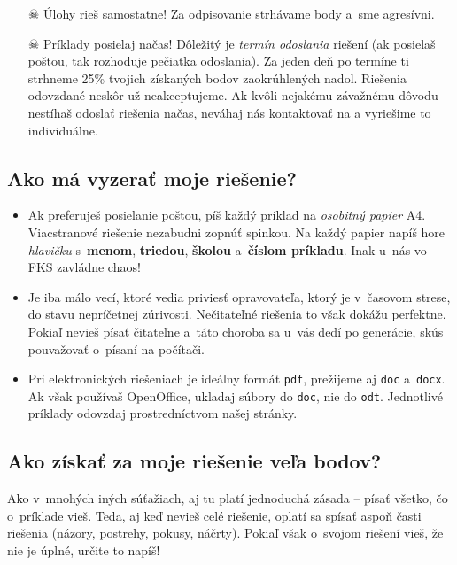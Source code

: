 \begin{itemize}
        \item[$\skull$] Úlohy rieš samostatne! Za odpisovanie strhávame body a~sme agresívni. 
    
        \item[$\skull$] Príklady posielaj načas! Dôležitý je \emph{termín odoslania} riešení (ak posielaš poštou, tak rozhoduje pečiatka odoslania).
            Za jeden deň po termíne ti strhneme 25\% tvojich získaných bodov zaokrúhlených nadol. 
            Riešenia odovzdané neskôr už neakceptujeme. Ak kvôli nejakému závažnému dôvodu nestíhaš odoslať riešenia načas, neváhaj nás kontaktovať na \URL{\seminarEmail}
            a vyriešime to individuálne.
    \end{itemize}

\subsection{Ako má vyzerať moje riešenie?}
    \begin{itemize}
        \item Ak preferuješ posielanie poštou, píš každý príklad na \emph{osobitný papier} A4. Viacstranové riešenie nezabudni
            zopnúť spinkou. Na každý papier napíš hore \emph{hlavičku} s~\textbf{menom}, \textbf{triedou}, \textbf{školou} a~\textbf{číslom príkladu}.
            Inak u~nás vo FKS zavládne chaos!
        \item Je iba málo vecí, ktoré vedia priviesť opravovateľa, ktorý je v~časovom strese, do stavu nepríčetnej zúrivosti. Nečitateľné riešenia to však dokážu perfektne.
            Pokiaľ nevieš písať čitateľne a~táto choroba sa u~vás dedí po generácie, skús pouvažovať o~písaní na počítači.
        \item Pri elektronických riešeniach je ideálny formát \texttt{pdf}, prežijeme aj \texttt{doc} a~\texttt{docx}.
            Ak však používaš OpenOffice, ukladaj súbory do \texttt{doc}, nie do \texttt{odt}.
            Jednotlivé príklady odovzdaj prostredníctvom našej stránky.
    \end{itemize}

\subsection{Ako získať za moje riešenie veľa bodov?}
    Ako v~mnohých iných súťažiach, aj tu platí jednoduchá zásada -- písať všetko, čo
    o~príklade vieš. Teda, aj keď nevieš celé riešenie, oplatí sa spísať aspoň časti
    riešenia (názory, postrehy, pokusy, náčrty). Pokiaľ však o~svojom riešení vieš, že
    nie je úplné, určite to napíš!

